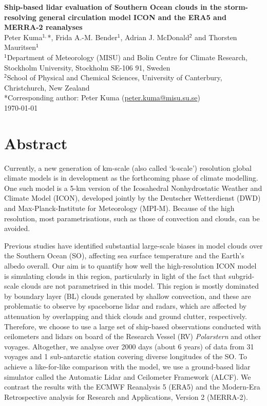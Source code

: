 \documentclass[12pt,a4paper]{article}
\begin{document}
\fontsize{13pt}{15pt}\selectfont

\begin{center} \Large \sffamily\textbf{Ship-based lidar evaluation of Southern Ocean clouds in the storm-resolving general circulation model ICON and the ERA5 and MERRA-2 reanalyses}\\[0.4cm]
\large Peter Kuma$^\mathsf{1,}$*, Frida A.-M. Bender$^\mathsf{1}$, Adrian J. McDonald$^\mathsf{2}$ and Thorsten Mauritsen$^\mathsf{1}$\\[0.4cm]
\small
$^\mathsf{1}$Department of Meteorology (MISU) and Bolin Centre for Climate Research, Stockholm University, Stockholm SE-106 91, Sweden\\[0.2cm]
$^\mathsf{2}$School of Physical and Chemical Sciences, University of Canterbury, Christchurch, New Zealand\\[0.2cm]
*Corresponding author: Peter Kuma (\href{mailto:peter.kuma@misu.su.se}{peter.kuma@misu.su.se})\\[0.4cm]
\large \today\\[0.4cm]

\end{center}

\section*{Abstract}

Currently, a new generation of km-scale (also called `k-scale') resolution
global climate models is in development as the forthcoming phase of climate
modelling. One such model is a 5-km version of the Icosahedral Nonhydrostatic
Weather and Climate Model (ICON), developed jointly by the Deutscher
Wetterdienst (DWD) and Max-Planck-Institute for Meteorology (MPI-M). Because of
the high resolution, most parametrisations, such as those of convection and
clouds, can be avoided.

Previous studies have identified substantial large-scale biases in model clouds
over the Southern Ocean (SO), affecting sea surface temperature and the Earth's
albedo overall. Our aim is to quantify how well the high-resolution ICON model
is simulating clouds in this region, particularly in light of the fact that
subgrid-scale clouds are not parametrised in this model. This region is mostly
dominated by boundary layer (BL) clouds generated by shallow convection, and
these are problematic to observe by spaceborne lidar and radars, which are
affected by attenuation by overlapping and thick clouds and ground clutter,
respectively. Therefore, we choose to use a large set of ship-based
observations conducted with ceilometers and lidars on board of the Research
Vessel (RV) \textit{Polarstern} and other voyages. Altogether, we analyse over
2000 days (about 6 years) of data from 31 voyages and 1 sub-antarctic station
covering diverse longitudes of the SO. To achieve a like-for-like comparison
with the model, we use a ground-based lidar simulator called the Automatic
Lidar and Ceilometer Framework (ALCF). We contrast the results with the ECMWF
Reanalysis 5 (ERA5) and the Modern-Era Retrospective analysis for Research and
Applications, Version 2 (MERRA-2).
\end{document}
